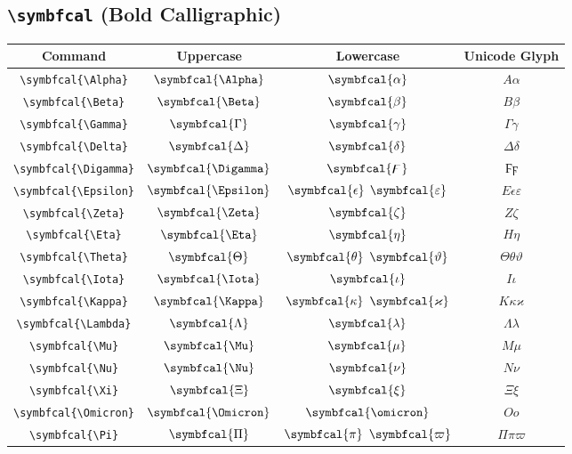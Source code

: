 \documentclass[12pt,a4paper]{article}
\begin{document}
\newpage

\subsection*{\texttt{\textbackslash{}symbfcal} (Bold Calligraphic)}

\begin{longtable}{|c|c|c|c|}
\hline
\textbf{Command} & \textbf{Uppercase} & \textbf{Lowercase} & \textbf{Unicode Glyph} \\
\hline
\verb|\symbfcal{\Alpha}| & $\symbfcal{\Alpha}$ & $\symbfcal{\alpha}$ & $ Α 𝛼 $ \\
\verb|\symbfcal{\Beta}| & $\symbfcal{\Beta}$ & $\symbfcal{\beta}$ & $ Β 𝛽 $ \\
\verb|\symbfcal{\Gamma}| & $\symbfcal{\Gamma}$ & $\symbfcal{\gamma}$ & $ Γ 𝛾 $ \\
\verb|\symbfcal{\Delta}| & $\symbfcal{\Delta}$ & $\symbfcal{\delta}$ & $ Δ 𝛿 $ \\
\verb|\symbfcal{\Digamma}| & $\symbfcal{\Digamma}$ & $\symbfcal{\digamma}$ & $ Ϝ ϝ $ \\
\verb|\symbfcal{\Epsilon}| & $\symbfcal{\Epsilon}$ & $\symbfcal{\epsilon}$ $\symbfcal{\varepsilon}$ & $ Ε 𝜖 𝜀 $ \\
\verb|\symbfcal{\Zeta}| & $\symbfcal{\Zeta}$ & $\symbfcal{\zeta}$ & $ Ζ 𝜁 $ \\
\verb|\symbfcal{\Eta}| & $\symbfcal{\Eta}$ & $\symbfcal{\eta}$ & $ Η 𝜂 $ \\
\verb|\symbfcal{\Theta}| & $\symbfcal{\Theta}$ & $\symbfcal{\theta}$ $\symbfcal{\vartheta}$ & $ Θ 𝜃 𝜗 $ \\
\verb|\symbfcal{\Iota}| & $\symbfcal{\Iota}$ & $\symbfcal{\iota}$ & $ Ι 𝜄 $ \\
\verb|\symbfcal{\Kappa}| & $\symbfcal{\Kappa}$ & $\symbfcal{\kappa}$ $\symbfcal{\varkappa}$ & $ Κ 𝜅 𝜘 $ \\
\verb|\symbfcal{\Lambda}| & $\symbfcal{\Lambda}$ & $\symbfcal{\lambda}$ & $ Λ 𝜆 $ \\
\verb|\symbfcal{\Mu}| & $\symbfcal{\Mu}$ & $\symbfcal{\mu}$ & $ Μ 𝜇 $ \\
\verb|\symbfcal{\Nu}| & $\symbfcal{\Nu}$ & $\symbfcal{\nu}$ & $ Ν 𝜈 $ \\
\verb|\symbfcal{\Xi}| & $\symbfcal{\Xi}$ & $\symbfcal{\xi}$ & $ Ξ 𝜉 $ \\
\verb|\symbfcal{\Omicron}| & $\symbfcal{\Omicron}$ & $\symbfcal{\omicron}$ & $ Ο 𝜊 $ \\
\verb|\symbfcal{\Pi}| & $\symbfcal{\Pi}$ & $\symbfcal{\pi}$ $\symbfcal{\varpi}$ & $ Π 𝜋 𝜛 $ \\

\end{longtable}
\end{document}
